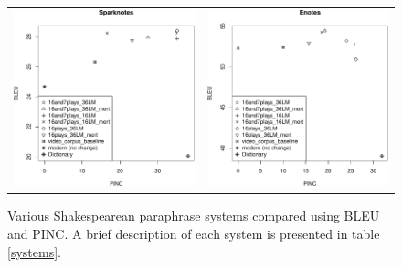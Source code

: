 \documentclass[10pt,a5paper,twoside]{article}
\begin{document}
\begin{figure}
  \begin{center}
    \begin{tabular}{cc}
      \includegraphics[width=2.4in]{figures/bleupinc1-crop.pdf} & \includegraphics[width=2.4in]{figures/bleupinc2-crop.pdf} \\
    \end{tabular}
  \end{center}
  \caption{Various Shakespearean paraphrase systems compared using BLEU and PINC.  A brief description of each system is presented in table \ref{systems}.}
  \label{bleupinc}
\end{figure}
\end{document}
